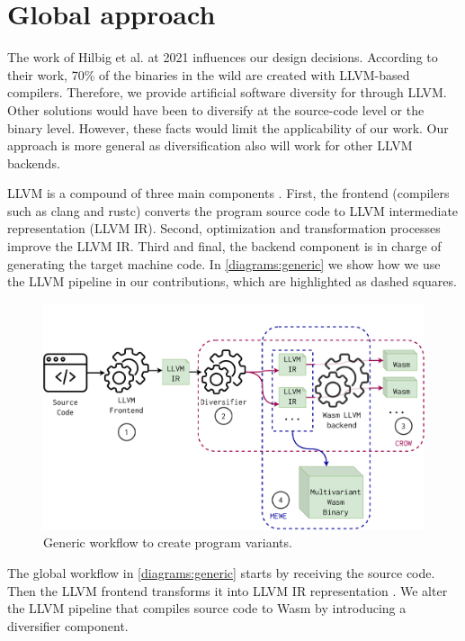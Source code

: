 \section{Global approach}
\label{tech:generic}


The work of Hilbig et al. \cite{Hilbig2021AnES} at 2021 influences our design decisions. According to their work, 70\% of the \wasm binaries in the wild are created with LLVM-based compilers. Therefore, we provide artificial software diversity for \wasm through LLVM. 
Other solutions would have been to diversify at the source-code level or the \wasm binary level. However, these facts would limit the applicability of our work.
Our approach is more general as diversification also will work for other LLVM backends.

LLVM is a compound of three main components \cite{llvmofficialweb}. First, the frontend (compilers such as clang and rustc) converts the program source code to LLVM intermediate representation (LLVM IR). Second, optimization and transformation processes improve the LLVM IR. Third and final, the backend component is in charge of generating the target machine code. In \autoref{diagrams:generic} we show how we use the LLVM pipeline in our contributions, which are highlighted as dashed squares.

\begin{figure}[h]
    \includegraphics[width=\linewidth]{diagrams/architecture.pdf}
    \caption{Generic workflow to create \wasm program variants.}
    \label{diagrams:generic}
\end{figure}



The global workflow in \autoref{diagrams:generic} starts by receiving the source code. Then the LLVM frontend transforms it into LLVM IR representation . 
We alter the LLVM pipeline that compiles source code to Wasm by introducing a diversifier component.  

